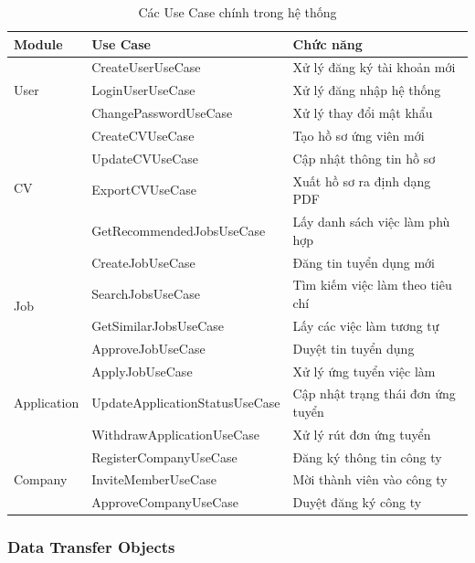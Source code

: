 \begin{table}[H]
\centering
\caption{Các Use Case chính trong hệ thống}
\label{tab:use-cases}
\begin{tabular}{|p{2.5cm}|p{4.5cm}|p{5cm}|}
\hline
\textbf{Module} & \textbf{Use Case} & \textbf{Chức năng} \\
\hline
\multirow{3}{*}{User} & CreateUserUseCase & Xử lý đăng ký tài khoản mới \\
\cline{2-3}
& LoginUserUseCase & Xử lý đăng nhập hệ thống \\
\cline{2-3}
& ChangePasswordUseCase & Xử lý thay đổi mật khẩu \\
\hline
\multirow{4}{*}{CV} & CreateCVUseCase & Tạo hồ sơ ứng viên mới \\
\cline{2-3}
& UpdateCVUseCase & Cập nhật thông tin hồ sơ \\
\cline{2-3}
& ExportCVUseCase & Xuất hồ sơ ra định dạng PDF \\
\cline{2-3}
& GetRecommendedJobsUseCase & Lấy danh sách việc làm phù hợp \\
\hline
\multirow{4}{*}{Job} & CreateJobUseCase & Đăng tin tuyển dụng mới \\
\cline{2-3}
& SearchJobsUseCase & Tìm kiếm việc làm theo tiêu chí \\
\cline{2-3}
& GetSimilarJobsUseCase & Lấy các việc làm tương tự \\
\cline{2-3}
& ApproveJobUseCase & Duyệt tin tuyển dụng \\
\hline
\multirow{3}{*}{Application} & ApplyJobUseCase & Xử lý ứng tuyển việc làm \\
\cline{2-3}
& UpdateApplicationStatusUseCase & Cập nhật trạng thái đơn ứng tuyển \\
\cline{2-3}
& WithdrawApplicationUseCase & Xử lý rút đơn ứng tuyển \\
\hline
\multirow{3}{*}{Company} & RegisterCompanyUseCase & Đăng ký thông tin công ty \\
\cline{2-3}
& InviteMemberUseCase & Mời thành viên vào công ty \\
\cline{2-3}
& ApproveCompanyUseCase & Duyệt đăng ký công ty \\
\hline
\end{tabular}
\end{table}

\subsubsection{Data Transfer Objects}

